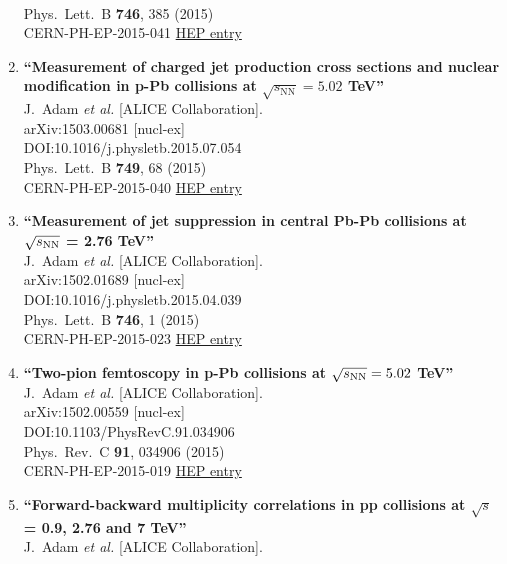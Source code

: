 \begin{enumerate}
  \\{}Phys.\ Lett.\ B {\bf 746}, 385 (2015)
  \\{}CERN-PH-EP-2015-041
\href{http://inspirehep.net/record/1351451}{HEP entry}
\item%
{\bf ``Measurement of charged jet production cross sections and nuclear modification in p-Pb collisions at $\sqrt{s_\mathrm{NN}} = 5.02$ TeV''}
  \\{}J.~Adam {\it et al.} [ALICE Collaboration].
  \\{}arXiv:1503.00681 [nucl-ex]
  \\{}DOI:10.1016/j.physletb.2015.07.054
  \\{}Phys.\ Lett.\ B {\bf 749}, 68 (2015)
  \\{}CERN-PH-EP-2015-040
\href{http://inspirehep.net/record/1346963}{HEP entry}
\item%
{\bf ``Measurement of jet suppression in central Pb-Pb collisions at $\sqrt{s_{\rm NN}}$ = 2.76 TeV''}
  \\{}J.~Adam {\it et al.} [ALICE Collaboration].
  \\{}arXiv:1502.01689 [nucl-ex]
  \\{}DOI:10.1016/j.physletb.2015.04.039
  \\{}Phys.\ Lett.\ B {\bf 746}, 1 (2015)
  \\{}CERN-PH-EP-2015-023
\href{http://inspirehep.net/record/1343112}{HEP entry}
\item%
{\bf ``Two-pion femtoscopy in p-Pb collisions at $\sqrt{s_{\rm NN}}=5.02$ TeV''}
  \\{}J.~Adam {\it et al.} [ALICE Collaboration].
  \\{}arXiv:1502.00559 [nucl-ex]
  \\{}DOI:10.1103/PhysRevC.91.034906
  \\{}Phys.\ Rev.\ C {\bf 91}, 034906 (2015)
  \\{}CERN-PH-EP-2015-019
\href{http://inspirehep.net/record/1342499}{HEP entry}
\item%
{\bf ``Forward-backward multiplicity correlations in pp collisions at $ \sqrt{s} $ = 0.9, 2.76 and 7 TeV''}
  \\{}J.~Adam {\it et al.} [ALICE Collaboration].

\end{enumerate}
